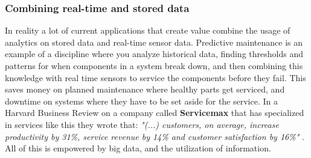 \documentclass[a4paper,english]{report}
\begin{document}
				\subsubsection{Combining real-time and stored data}
				In reality a lot of current applications that create value combine the usage of analytics on stored data and real-time sensor data. Predictive maintenance is an example of a discipline where you analyze historical data, finding thresholds and patterns for when components in a system break down, and then combining this knowledge with real time sensors to service the components before they fail. This saves money on planned maintenance where healthy parts get serviced, and downtime on systems where they have to be set aside for the service. In a Harvard Business Review on a company called \textbf{Servicemax} that has specialized in services like this they wrote that:
				\textit{"(...) customers, on average, increase productivity by 31\%, service revenue by 14\% and customer satisfaction by 16\%"} \cite{servicemax}. All of this is empowered by big data, and the utilization of information.
			
\end{document}
